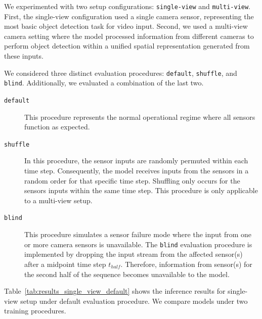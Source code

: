 We experimented with two setup configurations: \texttt{single-view} and \texttt{multi-view}. First, the single-view configuration used a single camera sensor, representing the most basic object detection task for video input. Second, we used a multi-view camera setting where the model processed information from different cameras to perform object detection within a unified spatial representation generated from these inputs.


We considered three distinct evaluation procedures: \texttt{default}, \texttt{shuffle}, and \texttt{blind}. Additionally, we evaluated a combination of the last two.

\begin{description}
    \item[\texttt{default}] This procedure represents the normal operational regime where all sensors function as expected.

    \item[\texttt{shuffle}] In this procedure, the sensor inputs are randomly permuted within each time step. Consequently, the model receives inputs from the sensors in a random order for that specific time step. Shuffling only occurs for the sensors inputs within the same time step. This procedure is only applicable to a multi-view setup.

    \item[\texttt{blind}] This procedure simulates a sensor failure mode where the input from one or more camera sensors is unavailable. The \texttt{blind} evaluation procedure is implemented by dropping the input stream from the affected sensor(s) after a midpoint time step $t_{half}$. Therefore, information from sensor(s) for the second half of the sequence becomes unavailable to the model. 
\end{description}

Table~\ref{tab:results_single_view_default} shows the inference results for single-view setup under default evaluation procedure. We compare models under two training procedures. 

